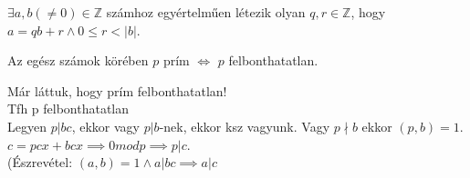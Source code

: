 \begin{frame}
  \begin{tcolorbox}[title={Tétel: Maradékos osztás $\mathbb{Z}$-ben}]
    ${\exists}a, b({\neq}0) \in \mathbb{Z}$ számhoz egyértelműen létezik olyan $q, r \in \mathbb{Z}$, hogy\\
    $a = qb + r \land 0 \leq r < |b|$.
  \end{tcolorbox}
\end{frame}

\begin{frame}
  \begin{tcolorbox}[title={Tétel: Prím és irreducibilis elem $\mathbb{Z}$-ben}]
    Az egész számok körében $p$ prím $\iff$ $p$ felbonthatatlan.
  \end{tcolorbox}

  \begin{tcolorbox}[title={Bizonyítás}]
    Már láttuk, hogy prím felbonthatatlan!\\
    Tfh p felbonthatatlan\\
    Legyen $p|bc$, ekkor vagy $p | b$-nek, ekkor ksz vagyunk.
    Vagy $p \nmid b$ ekkor $(p,b) = 1$.\\
    $c = pcx +bcx \implies 0 mod p \implies p | c$.\\
    (Észrevétel: $(a, b) = 1 \land a | bc \implies a | c$
  \end{tcolorbox}
\end{frame}

